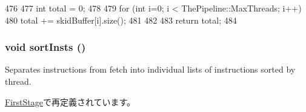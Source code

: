 \begin{DoxyCode}
476 {
477     int total = 0;
478 
479     for (int i=0; i < ThePipeline::MaxThreads; i++) {
480         total += skidBuffer[i].size();
481     }
482 
483     return total;
484 }
\end{DoxyCode}
\hypertarget{classPipelineStage_a9ff2aa32ab0f40674cb3518108d62f8e}{
\subsubsection[{sortInsts}]{\setlength{\rightskip}{0pt plus 5cm}void sortInsts ()}}
\label{classPipelineStage_a9ff2aa32ab0f40674cb3518108d62f8e}
Separates instructions from fetch into individual lists of instructions sorted by thread. 

\hyperlink{classFirstStage_a9ff2aa32ab0f40674cb3518108d62f8e}{FirstStage}で再定義されています。


